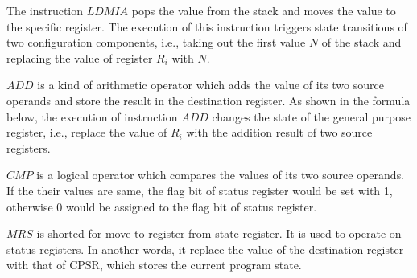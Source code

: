 \documentclass[letterpaper, 10 pt, conference]{IEEEtran}
\begin{document}
\par The instruction $LDMIA$ pops the value from the stack and moves the value to the specific register. The execution of this instruction triggers state transitions of two configuration components, i.e., taking out the first value $N$ of the stack and replacing the value of register $R_i$ with $N$.
\par $ADD$ is a kind of arithmetic operator which adds the value of its two source operands and store the result in the destination register. As shown in the formula below, the execution of instruction $ADD$ changes the state of the general purpose register, i.e., replace the value of $R_i$ with the addition result of two source registers.
\par $CMP$ is a logical operator which compares the values of its two source operands. If the their values are same, the flag bit of status register would be set with 1, otherwise 0 would be assigned to the flag bit of status register.
\par $MRS$ is shorted for move to register from state register. It is used to operate on status registers. In another words, it replace the value of the destination register with that of CPSR, which stores the current program state.
\end{document}
